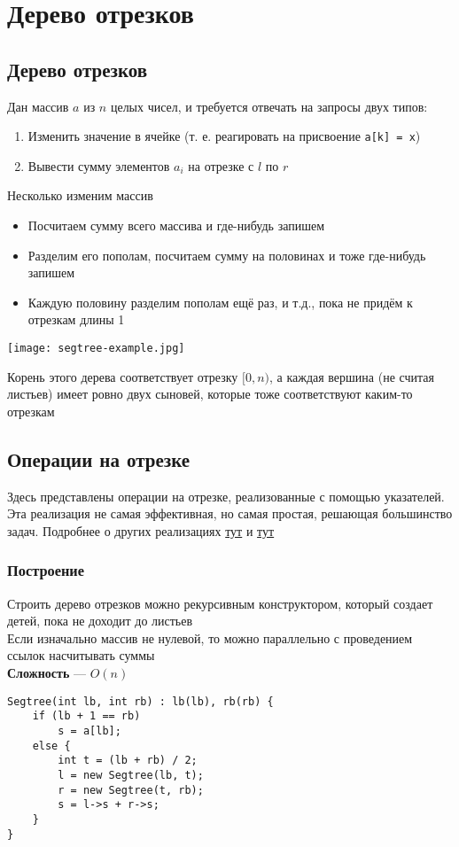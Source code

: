 \documentclass[a4paper]{article}
\newcommand{\code}[1]{\colorbox{codegray}{\texttt{#1}}}
\begin{document}
\section{Дерево отрезков}
\subsection{Дерево отрезков}
Дан массив $a$ из $n$ целых чисел, и требуется отвечать на запросы двух типов:
\begin{enumerate}
    \item Изменить значение в ячейке (т. е. реагировать на присвоение \code{a[k] = x})
    \item Вывести сумму элементов $a_i$ на отрезке с $l$ по $r$
\end{enumerate}
Несколько изменим массив
\begin{itemize}
    \item Посчитаем сумму всего массива и где-нибудь запишем
    \item Разделим его пополам, посчитаем сумму на половинах и тоже где-нибудь запишем
    \item Каждую половину разделим пополам ещё раз, и т.д., пока не придём к отрезкам длины 1
\end{itemize}
\begin{center}
    \texttt{[image: segtree-example.jpg]}
    \label{segtree-ex}
\end{center}
Корень этого дерева соответствует отрезку $[0, n)$, а каждая вершина (не считая листьев) имеет ровно двух сыновей, которые тоже соответствуют каким-то отрезкам

\subsection{Операции на отрезке}
Здесь представлены операции на отрезке, реализованные с помощью указателей. Эта реализация не самая эффективная, но самая простая, решающая большинство задач. Подробнее о других реализациях \href{http://e-maxx.ru/algo/segment_tree}{тут} и \href{https://codeforces.com/blog/entry/18051}{тут}
\subsubsection{Построение}
Строить дерево отрезков можно рекурсивным конструктором, который создает детей, пока не доходит до листьев\\[2mm]
\indent Если изначально массив не нулевой, то можно параллельно с проведением ссылок насчитывать суммы\\[2mm]
\indent \textbf{Сложность} — $O(n)$
\begin{lstlisting}
Segtree(int lb, int rb) : lb(lb), rb(rb) {
    if (lb + 1 == rb)
        s = a[lb];
    else {
        int t = (lb + rb) / 2;
        l = new Segtree(lb, t);
        r = new Segtree(t, rb);
        s = l->s + r->s;
    }
}
\end{lstlisting}
\end{document}
